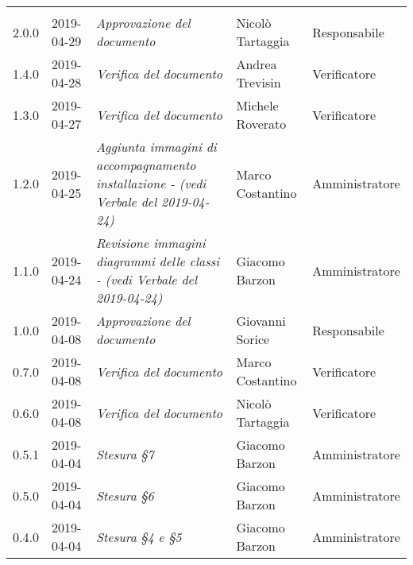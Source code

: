 \newpage 
\section*{}
\begin{longtable}{C{2cm}|C{2.5cm}|C{4.5cm}|C{2.5cm}|C{3cm}}
	
	 &  &  &  &   \\
	\endhead
	
	2.0.0 & 2019-04-29 &  \emph{Approvazione del documento} & Nicolò Tartaggia & Responsabile \\
	\hline
	
	1.4.0 & 2019-04-28 &  \emph{Verifica del documento} & Andrea Trevisin & Verificatore \\
	\hline
	
	1.3.0 & 2019-04-27 &  \emph{Verifica del documento} & Michele Roverato & Verificatore \\
	\hline
	
	1.2.0 & 2019-04-25 &  \emph{Aggiunta immagini di accompagnamento installazione - (vedi Verbale del 2019-04-24)} & Marco Costantino & Amministratore \\
	\hline
	
	1.1.0 & 2019-04-24 &  \emph{Revisione immagini diagrammi delle classi - (vedi Verbale del 2019-04-24)} & Giacomo Barzon & Amministratore \\
	\hline
	
	1.0.0 & 2019-04-08 &  \emph{Approvazione del documento} & Giovanni Sorice  & Responsabile\\
	\hline
	
	0.7.0 & 2019-04-08 & \emph{Verifica del documento} & Marco Costantino & Verificatore \\
	\hline
	
	0.6.0 & 2019-04-08 & \emph{Verifica del documento} & Nicolò Tartaggia & Verificatore \\
	\hline
	
	0.5.1 & 2019-04-04 & \emph{Stesura §7} & Giacomo Barzon & Amministratore \\
	\hline
	
	0.5.0 & 2019-04-04 & \emph{Stesura §6} & Giacomo Barzon & Amministratore \\
	\hline
	
	0.4.0 & 2019-04-04 & \emph{Stesura §4 e §5} & Giacomo Barzon & Amministratore \\
	\hline
	

\end{longtable}
